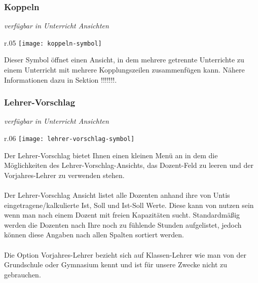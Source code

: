 \newpage

\subsubsection{Koppeln}
{\small\textit{verfügbar in Unterricht Ansichten\\}\par}

\begin{wrapfigure}{r}{.05\textwidth}
	\vspace{-50pt}
	\texttt{[image: koppeln-symbol]}
	\vspace{-35pt}
\end{wrapfigure}

\noindent
Dieser Symbol öffnet einen Ansicht, in dem mehrere getrennte Unterrichte zu einem Unterricht mit mehrere Kopplungszeilen zusammenfügen kann. Nähere Informationen dazu in Sektion !!!!!!!.\\

\subsubsection{Lehrer-Vorschlag}
{\small\textit{verfügbar in Unterricht Ansichten\\}\par}

\begin{wrapfigure}{r}{.06\textwidth}
	\vspace{-50pt}
	\texttt{[image: lehrer-vorschlag-symbol]}
	\vspace{-35pt}
\end{wrapfigure}

\noindent
Der Lehrer-Vorschlag bietet Ihnen einen kleinen Menü an in dem die Möglichkeiten des Lehrer-Vorschlag-Ansichts, das Dozent-Feld zu leeren und der Vorjahres-Lehrer zu verwenden stehen.\\
\\
Der Lehrer-Vorschlag Ansicht listet alle Dozenten anhand ihre von Untis eingetragene/kalkulierte Ist, Soll und Ist-Soll Werte. Diese kann von nutzen sein wenn man nach einem Dozent mit freien Kapazitäten sucht. Standardmäßig werden die Dozenten nach Ihre noch zu fühlende Stunden aufgelistet, jedoch können diese Angaben nach allen Spalten sortiert werden.\\
\\
Die Option Vorjahres-Lehrer bezieht sich auf Klassen-Lehrer wie man von der Grundschule oder Gymnasium kennt und ist für unsere Zwecke nicht zu gebrauchen.\\


